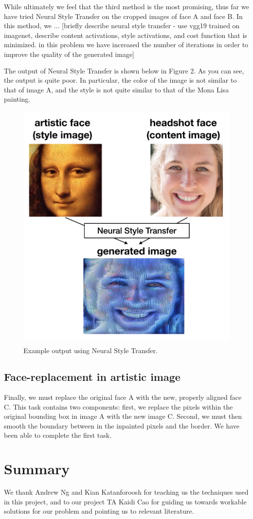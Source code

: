 \documentclass{pnastwo2}
\begin{document}
\begin{article}
While ultimately we feel that the third method is the most promising, thus far we have tried Neural Style Transfer on the cropped images of face A and face B. In this method, we ... [briefly describe neural style transfer - use vgg19 trained on imagenet, describe content activations, style activations, and cost function that is minimized. in this problem we have increased the number of iterations in order to improve the quality of the generated image]

The output of Neural Style Transfer is shown below in Figure 2. As you can see, the output is quite poor. In particular, the color of the image is not similar to that of image A, and the style is not quite similar to that of the Mona Lisa painting. 

\begin{figure}[ht]
	\begin{center}
		\includegraphics[width=.4\textwidth]{neural_style_transfer_output}
		\caption{Example output using Neural Style Transfer.} \label{fig:nst}
	\end{center}
\end{figure} 

\subsection{Face-replacement in artistic image}

Finally, we must replace the original face A with the new, properly aligned face C. This task contains two components: first, we replace the pixels within the original bounding box in image A with the new image C. Second, we must then smooth the boundary between in the inpainted pixels and the border. We have been able to complete the first task. 

\section{Summary}


\begin{acknowledgments}
We thank Andrew Ng and Kian Katanforoosh for teaching us the techniques used in this project, and to our project TA Kaidi Cao for guiding us towards workable solutions for our problem and pointing us to relevant literature.
\end{acknowledgments}




\end{article}
\end{document}
